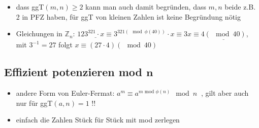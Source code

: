 \documentclass[10pt,a4paper]{article}
\begin{document}
\begin{itemize}
\item dass ggT$(m,n)\geq 2$ kann man auch damit begründen, dass $m,n$ beide z.B. 2 in PFZ haben, für ggT von kleinen Zahlen ist keine Begründung nötig
\item Gleichungen in $\mathbb{Z}_{n}$: $\underline{123^{321}\cdot x\equiv}  3^{321(\mod \phi(40))}\cdot x\equiv 3x \equiv \underline{ 4 (\mod 40)}$, mit $3^{-1}=27$ folgt $x\equiv (27\cdot 4 )(\mod 40) $
\end{itemize}



\subsection{Effizient potenzieren mod $\boldsymbol{n}$}
\begin{itemize}


\item andere Form von Euler-Fermat: $a^{m} \equiv a^{m \text { mod } \phi (n)} \mod n\;\;$, gilt aber auch nur für ggT$(a,n)=1$ !!
\item einfach die Zahlen Stück für Stück mit mod zerlegen
\end{itemize}
\end{document}
